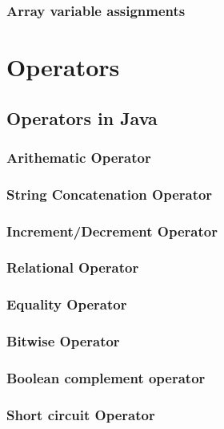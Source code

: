 \documentclass[14pt,fleqn]{extbook} %
\begin{document}
\subsection{Array variable assignments}



\chapter{Operators}
\section{Operators in Java}

\subsection{Arithematic Operator}

\subsection{String Concatenation Operator}

\subsection{Increment/Decrement Operator}

\subsection{Relational Operator}

\subsection{Equality Operator}

\subsection{Bitwise Operator}

\subsection{Boolean complement operator}

\subsection{Short circuit Operator}

\end{document}
